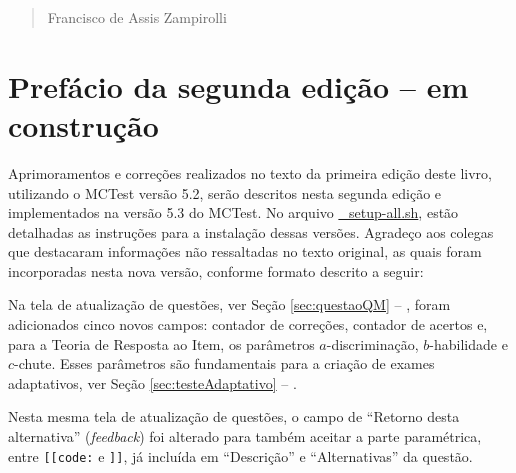 \begin{verse}
    \vspace*{2mm}
	\begin{flushright}
		Francisco de Assis Zampirolli\\
            \date{7 de setembro de 2023}
	\end{flushright}
\end{verse}

\newpage


\section*{Prefácio da segunda edição -- em construção}

Aprimoramentos e correções realizados no texto da primeira edição deste livro, utilizando o MCTest versão 5.2, serão descritos nesta segunda edição e implementados na versão 5.3 do MCTest. No arquivo \href{https://github.com/fzampirolli/mctest/blob/master/_setup-all.sh}{\_setup-all.sh}, estão detalhadas as instruções para a instalação dessas versões. Agradeço aos colegas que destacaram informações não ressaltadas no texto original, as quais foram incorporadas nesta nova versão, conforme formato descrito a seguir:


Na tela de atualização de questões, ver Seção \ref{sec:questaoQM} -- , foram adicionados cinco novos campos: contador de correções, contador de acertos e, para a Teoria de Resposta ao Item, os parâmetros \(a\)-discriminação, \(b\)-habilidade e \(c\)-chute. Esses parâmetros são fundamentais para a criação de exames adaptativos, ver Seção \ref{sec:testeAdaptativo} -- . 

Nesta mesma tela de atualização de questões, o campo de ``Retorno desta alternativa'' (\textit{feedback}) foi alterado para também aceitar a parte paramétrica, entre \verb|[[code:| e \verb|]]|, já incluída em ``Descrição'' e ``Alternativas'' da questão.



